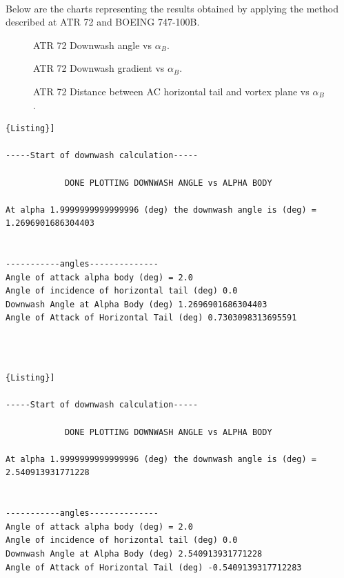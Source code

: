 \noindent \\

Below are the charts representing the results obtained by applying the method described at ATR 72 and BOEING 747-100B.

\begin{figure}[H]
\centering

\caption{ATR 72 Downwash angle vs $\alpha_{B}$.}
\label{fig:epsilon}
\end{figure}

\begin{figure}[H]
\centering

\caption{ATR 72 Downwash gradient vs $\alpha_{B}$.}
\label{fig:downwashgradATR}
\end{figure}

\begin{figure}[H]
\centering

\caption{ATR 72 Distance between AC horizontal tail and vortex plane vs $\alpha_{B}$.}
\label{fig:zATR}
\end{figure}


\begin{lstlisting}[caption={{\footnotesize Downwash estimation - Results. ATR 72}},label= [style=\bfseries]{Listing}]

-----Start of downwash calculation-----

			DONE PLOTTING DOWNWASH ANGLE vs ALPHA BODY

At alpha 1.9999999999999996 (deg) the downwash angle is (deg) = 1.2696901686304403

 
-----------angles-------------- 
Angle of attack alpha body (deg) = 2.0
Angle of incidence of horizontal tail (deg) 0.0
Downwash Angle at Alpha Body (deg) 1.2696901686304403
Angle of Attack of Horizontal Tail (deg) 0.7303098313695591
\end{lstlisting}


\noindent \\ \\
\begin{lstlisting}[caption={{\footnotesize Downwash estimation - Results. BOEING 747-100B}},label= [style=\bfseries]{Listing}]

-----Start of downwash calculation-----

			DONE PLOTTING DOWNWASH ANGLE vs ALPHA BODY

At alpha 1.9999999999999996 (deg) the downwash angle is (deg) = 2.540913931771228

 
-----------angles-------------- 
Angle of attack alpha body (deg) = 2.0
Angle of incidence of horizontal tail (deg) 0.0
Downwash Angle at Alpha Body (deg) 2.540913931771228
Angle of Attack of Horizontal Tail (deg) -0.5409139317712283
\end{lstlisting}


